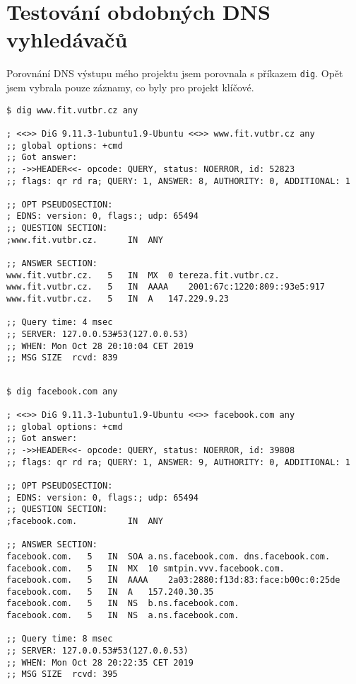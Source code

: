 \documentclass[a4paper, 11pt]{article}
\begin{document}
\section{Testování obdobných DNS vyhledávačů}
Porovnání DNS výstupu mého projektu jsem porovnala s příkazem \verb|dig|. Opět jsem vybrala pouze záznamy, co byly pro projekt klíčové.
\begin{lstlisting}
$ dig www.fit.vutbr.cz any

; <<>> DiG 9.11.3-1ubuntu1.9-Ubuntu <<>> www.fit.vutbr.cz any
;; global options: +cmd
;; Got answer:
;; ->>HEADER<<- opcode: QUERY, status: NOERROR, id: 52823
;; flags: qr rd ra; QUERY: 1, ANSWER: 8, AUTHORITY: 0, ADDITIONAL: 1

;; OPT PSEUDOSECTION:
; EDNS: version: 0, flags:; udp: 65494
;; QUESTION SECTION:
;www.fit.vutbr.cz.		IN	ANY

;; ANSWER SECTION:
www.fit.vutbr.cz.	5	IN	MX	0 tereza.fit.vutbr.cz.
www.fit.vutbr.cz.	5	IN	AAAA	2001:67c:1220:809::93e5:917
www.fit.vutbr.cz.	5	IN	A	147.229.9.23

;; Query time: 4 msec
;; SERVER: 127.0.0.53#53(127.0.0.53)
;; WHEN: Mon Oct 28 20:10:04 CET 2019
;; MSG SIZE  rcvd: 839

\end{lstlisting}
\begin{lstlisting}

$ dig facebook.com any

; <<>> DiG 9.11.3-1ubuntu1.9-Ubuntu <<>> facebook.com any
;; global options: +cmd
;; Got answer:
;; ->>HEADER<<- opcode: QUERY, status: NOERROR, id: 39808
;; flags: qr rd ra; QUERY: 1, ANSWER: 9, AUTHORITY: 0, ADDITIONAL: 1

;; OPT PSEUDOSECTION:
; EDNS: version: 0, flags:; udp: 65494
;; QUESTION SECTION:
;facebook.com.			IN	ANY

;; ANSWER SECTION:
facebook.com.	5	IN	SOA	a.ns.facebook.com. dns.facebook.com. 
facebook.com.	5	IN	MX	10 smtpin.vvv.facebook.com.
facebook.com.	5	IN	AAAA	2a03:2880:f13d:83:face:b00c:0:25de
facebook.com.	5	IN	A	157.240.30.35
facebook.com.	5	IN	NS	b.ns.facebook.com.
facebook.com.	5	IN	NS	a.ns.facebook.com.

;; Query time: 8 msec
;; SERVER: 127.0.0.53#53(127.0.0.53)
;; WHEN: Mon Oct 28 20:22:35 CET 2019
;; MSG SIZE  rcvd: 395
\end{lstlisting}
\end{document}
